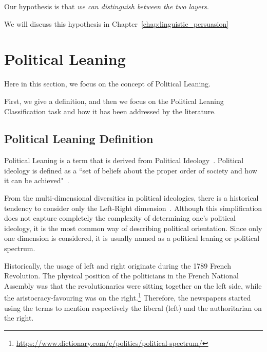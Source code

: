 

Our hypothesis is that \emph{we can distinguish between the two layers}.

We will discuss this hypothesis in Chapter~\ref{chap:linguistic_persuasion}


\section{\statusred Political Leaning}
\label{sec:lit_leaning}


Here in this section, we focus on the concept of Political Leaning.

First, we give a definition, and then we focus on the Political Leaning Classification task and how it has been addressed by the literature.

\subsection{Political Leaning Definition}

Political Leaning is a term that is derived from Political Ideology~\citep{jost2009political}.
Political ideology is defined as a ``set of beliefs about the proper order of society and how it can be achieved"~\citep[p.~64]{erikson2015american}.

From the multi-dimensional diversities in political ideologies, there is a historical tendency to consider only the Left-Right dimension~\citep{jost2009political}.
Although this simplification does not capture completely the complexity of determining one's political ideology, it is the most common way of describing political orientation.
Since only one dimension is considered, it is usually named as a political leaning or political spectrum.


Historically, the usage of left and right originate during the 1789 French Revolution. The physical position of the politicians in the French National Assembly was that the revolutionaries were sitting together on the left side, while the aristocracy-favouring was on the right.\footnote{\url{https://www.dictionary.com/e/politics/political-spectrum/}}
Therefore, the newspapers started using the terms to mention respectively the liberal (left) and the authoritarian on the right.

